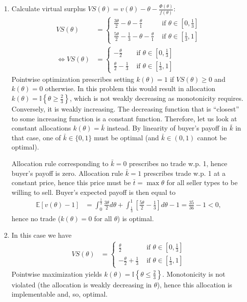 \documentclass[a4paper]{article}
\begin{document}
\begin{enumerate}
	
	\item 
	Calculate virtual surplus $VS(\theta) = v(\theta) - \theta - \frac{\Phi(\theta)}{f(\theta)}$: 
	\begin{align*}
		VS(\theta) &= 
		\begin{cases}
			\frac{3\theta}{2} - \theta - \frac{\theta}{1} &\text{ if } \theta \in [0, \frac{1}{3}]
			\\
			\frac{5\theta}{2} - \frac{1}{3} - \theta - \frac{\theta}{1} &\text{ if } \theta \in [\frac{1}{3}, 1]
		\end{cases}
		\\
		\Leftrightarrow
		VS(\theta) &= 
		\begin{cases}
			-\frac{\theta}{2} &\text{ if } \theta \in [0, \frac{1}{3}]
			\\
			\frac{\theta}{2} - \frac{1}{3} &\text{ if } \theta \in [\frac{1}{3}, 1]
		\end{cases}
	\end{align*}
	Pointwise optimization prescribes setting $k(\theta) = 1$ if $VS(\theta) \geq 0$ and $k(\theta) = 0$ otherwise. In this problem this would result in allocation $k(\theta) = \mathbb{I} \left\{ \theta \geq \frac{2}{3} \right\}$, which is not weakly decreasing as monotonicity requires.
	Conversely, it is weakly increasing. The decreasing function that is ``closest'' to some increasing function is a constant function.
	Therefore, let us look at constant allocations $k(\theta) = \bar{k}$ instead. By linearity of buyer's payoff in $\bar{k}$ in that case, one of $\bar{k} \in \{0,1\}$ must be optimal (and $\bar{k} \in (0,1)$ cannot be optimal).
	
	Allocation rule corresponding to $\bar{k} = 0$ prescribes no trade w.p. 1, hence buyer's payoff is zero. Allocation rule $\bar{k} = 1$ prescribes trade w.p. 1 at a constant price, hence this price must be $\bar{t} = \max \theta$ for all seller types to be willing to sell. Buyer's expected payoff is then equal to
	\begin{align*}
		\mathbb{E} \left[ v(\theta) - 1 \right] &= \int_0^{\frac{1}{3}} \frac{3\theta}{2} d\theta + \int_{\frac{1}{3}}^{1} \left[ \frac{5 \theta}{2} - \frac{1}{3} \right] d\theta -1 = \frac{35}{36} - 1 < 0,
	\end{align*}
	hence no trade ($k(\theta) = 0$ for all $\theta$) is optimal.
	
	
	\item 	
	In this case we have
	\begin{align*}
		VS(\theta) &= 
		\begin{cases}
			\frac{\theta}{2} &\text{ if } \theta \in [0, \frac{1}{3}]
			\\
			-\frac{\theta}{2} + \frac{1}{3} &\text{ if } \theta \in [\frac{1}{3}, 1]
		\end{cases}
	\end{align*}
	Pointwise maximization yields $k(\theta) = \mathbb{I} \left\{ \theta \leq \frac{2}{3} \right\}$. Monotonicity is not violated (the allocation is weakly decreasing in $\theta$), hence this allocation is implementable and, so, optimal.
\end{enumerate}
\end{document}
